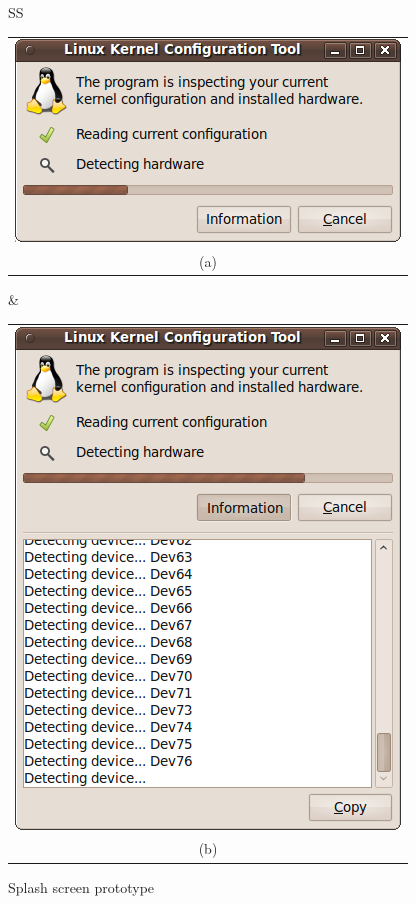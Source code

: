 \documentclass{chi2009}
\begin{document}
\begin{figure}[!t]
 \centering
\begin{tabular}{SS}
 \begin{tabular}{c}
  \includegraphics[scale=0.5,keepaspectratio=true]{figs/splash-final1} \\
  (a) \\
 \end{tabular}
  & 
\begin{tabular}{c}
  \includegraphics[scale=0.5,keepaspectratio=true]{figs/splash-final2} \\
  (b) \\
 \end{tabular}
\end{tabular}
\caption{Splash screen prototype}
\label{fig:splash-final}
\end{figure}
\end{document}
